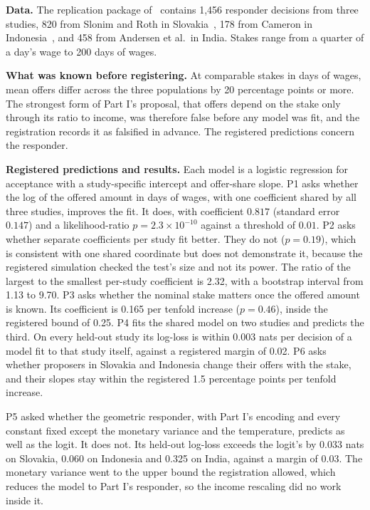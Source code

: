 \documentclass[journal]{IEEEtran}
\begin{document}
\textbf{Data.}
The replication package of~\cite{andersen2011} contains 1{,}456 responder decisions from three studies, 820 from Slonim and Roth in Slovakia~\cite{slonim1998}, 178 from Cameron in Indonesia~\cite{cameron1999}, and 458 from Andersen et al.\ in India.
Stakes range from a quarter of a day's wage to 200 days of wages.

\textbf{What was known before registering.}
At comparable stakes in days of wages, mean offers differ across the three populations by 20 percentage points or more.
The strongest form of Part I's proposal, that offers depend on the stake only through its ratio to income, was therefore false before any model was fit, and the registration records it as falsified in advance.
The registered predictions concern the responder.

\textbf{Registered predictions and results.}
Each model is a logistic regression for acceptance with a study-specific intercept and offer-share slope.
P1 asks whether the log of the offered amount in days of wages, with one coefficient shared by all three studies, improves the fit.
It does, with coefficient $0.817$ (standard error $0.147$) and a likelihood-ratio $p=2.3\times10^{-10}$ against a threshold of $0.01$.
P2 asks whether separate coefficients per study fit better.
They do not ($p=0.19$), which is consistent with one shared coordinate but does not demonstrate it, because the registered simulation checked the test's size and not its power.
The ratio of the largest to the smallest per-study coefficient is 2.32, with a bootstrap interval from 1.13 to 9.70.
P3 asks whether the nominal stake matters once the offered amount is known.
Its coefficient is 0.165 per tenfold increase ($p=0.46$), inside the registered bound of 0.25.
P4 fits the shared model on two studies and predicts the third.
On every held-out study its log-loss is within 0.003 nats per decision of a model fit to that study itself, against a registered margin of 0.02.
P6 asks whether proposers in Slovakia and Indonesia change their offers with the stake, and their slopes stay within the registered 1.5 percentage points per tenfold increase.

P5 asked whether the geometric responder, with Part I's encoding and every constant fixed except the monetary variance and the temperature, predicts as well as the logit.
It does not.
Its held-out log-loss exceeds the logit's by 0.033 nats on Slovakia, 0.060 on Indonesia and 0.325 on India, against a margin of 0.03.
The monetary variance went to the upper bound the registration allowed, which reduces the model to Part I's responder, so the income rescaling did no work inside it.
\end{document}
